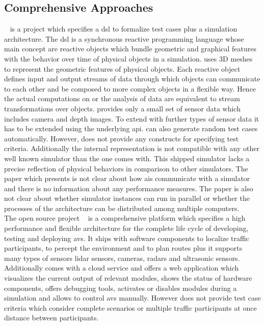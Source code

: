 \subsection{Comprehensive Approaches}
\paracosm{}~\cite{paracosm} is a project which specifies a \gls{dsl} to formalize test cases plus a simulation architecture.
The \gls{dsl} is a synchronous reactive programming language whose main concept are reactive objects which bundle geometric and graphical features with the behavior over time of physical objects in a simulation.
\paracosm{} uses 3D meshes to represent the geometric features of physical objects.
Each reactive object defines input and output streams of data through which objects can communicate to each other and be composed to more complex objects in a flexible way.
Hence the actual computations on or the analysis of data are equivalent to stream transformations over objects.
\paracosm{} provides only a small set of sensor data which includes camera and depth images.
To extend \paracosm{} with further types of sensor data it has to be extended using the underlying \gls{api}.
\paracosm{} can also generate random test cases automatically.
However, \paracosm{} does not provide any constructs for specifying test criteria.
Additionally the internal representation is not compatible with any other well known simulator than the one \paracosm{} comes with.
This shipped simulator lacks a precise reflection of physical behaviors in comparison to other simulators.
The paper which presents \paracosm{} is not clear about how \glspl{ai} communicate with a simulator and there is no information about any performance measures.
The paper is also not clear about whether simulator instances can run in parallel or whether the processes of the architecture can be distributed among multiple computers.\\
The open source project \apollo{}~\cite{apollo} is a comprehensive platform which specifies a high performance and flexible architecture for the complete life cycle of developing, testing and deploying \glspl{av}.
It ships with software components to localize traffic participants, to percept the environment and to plan routes plus it supports many types of sensors \eg{} \gls{lidar} sensors, cameras, radars and ultrasonic sensors.
Additionally \apollo{} comes with a cloud service and offers a web application which visualizes the current output of relevant modules, shows the status of hardware components, offers debugging tools, activates or disables modules during a simulation and allows to control \glspl{av} manually.
However \apollo{} does not provide test case criteria which consider complete scenarios or multiple traffic participants at once \eg{} distance between participants.\\
